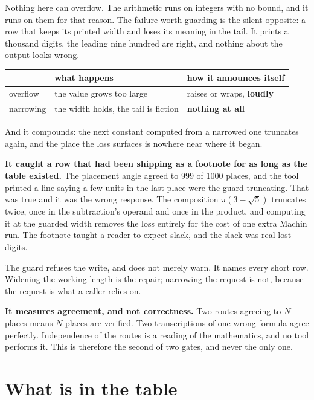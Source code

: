 Nothing here can overflow. The arithmetic runs on integers with no bound, and it runs on them for that reason.
The failure worth guarding is the silent opposite: a row that keeps its printed width and loses its
meaning in the tail. It prints a thousand digits, the leading nine hundred are right, and nothing
about the output looks wrong.

\begin{center}
\begin{tabular}{@{}lll@{}}
\toprule
 & what happens & how it announces itself \\
\midrule
overflow & the value grows too large & raises or wraps, \textbf{loudly} \\
narrowing & the width holds, the tail is fiction & \textbf{nothing at all} \\
\bottomrule
\end{tabular}
\end{center}

And it compounds: the next constant computed from a narrowed one truncates again, and the place the
loss surfaces is nowhere near where it began.

\textbf{It caught a row that had been shipping as a footnote for as long as the table existed.} The
placement angle agreed to 999 of 1000 places, and the tool printed a line saying a few units in the
last place were the guard truncating. That was true and it was the wrong response. The composition
\(\pi(3-\sqrt5)\) truncates twice, once in the subtraction's operand and once in the product, and
computing it at the guarded width removes the loss entirely for the cost of one extra Machin run.
The footnote taught a reader to expect slack, and the slack was real lost digits.

The guard refuses the write, and does not merely warn. It names every short row. Widening the working
length is the repair; narrowing the request is not, because the request is what a caller relies on.

\textbf{It measures agreement, and not correctness.} Two routes agreeing to \(N\) places means
\(N\) places are verified. Two transcriptions of one wrong formula agree perfectly. Independence of
the routes is a reading of the mathematics, and no tool performs it. This is therefore the second of two
gates, and never the only one.

\section{What is in the table}

